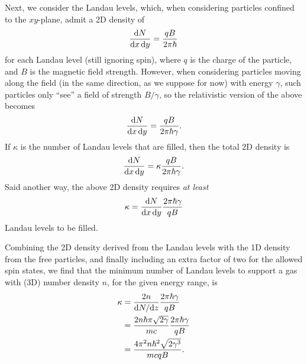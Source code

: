 \documentclass{book}
\begin{document}
Next, we consider the Landau levels, which, when considering particles confined to the $xy$-plane, admit a 2D density of
\begin{equation}
  \frac{{\rm d}N}{{\rm d}x\,{\rm d}y} = \frac{qB}{2\pi\hbar}
\end{equation}
for each Landau level (still ignoring spin), where $q$ is the charge of the particle, and $B$ is the magnetic field strength.
However, when considering particles moving along the field (in the same direction, as we suppose for now) with energy $\gamma$, such particles only ``see'' a field of strength $B/\gamma$, so the relativistic version of the above becomes
\begin{equation}
  \frac{{\rm d}N}{{\rm d}x\,{\rm d}y} = \frac{qB}{2\pi\hbar\gamma}.
\end{equation}
If $\kappa$ is the number of Landau levels that are filled, then the total 2D density is
\begin{equation}
  \frac{{\rm d}N}{{\rm d}x\,{\rm d}y} = \kappa \frac{qB}{2\pi\hbar\gamma}.
\end{equation}
Said another way, the above 2D density requires \emph{at least}
\begin{equation}
  \kappa = \frac{{\rm d}N}{{\rm d}x\,{\rm d}y} \frac{2\pi\hbar\gamma}{qB}
\end{equation}
Landau levels to be filled.

Combining the 2D density derived from the Landau levels with the 1D density from the free particles, and finally including an extra factor of two for the allowed spin states, we find that the minimum number of Landau levels to support a gas with (3D) number density $n$, for the given energy range, is
\begin{equation}
  \begin{aligned}
    \kappa
      &= \frac{2n}{{\rm d}N/{\rm d}z} \frac{2\pi\hbar\gamma}{qB} \\
      &= \frac{2n\hbar\pi\sqrt{2\gamma}}{mc} \frac{2\pi\hbar\gamma}{qB} \\
      &= \frac{4\pi^2 n \hbar^2 \sqrt{2\gamma^3}}{mcqB}.
  \end{aligned}
\end{equation}
\end{document}
